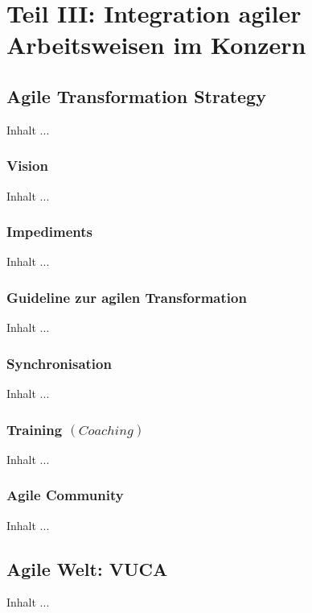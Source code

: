 
\chapter{Teil III: Integration agiler Arbeitsweisen im Konzern}
\minitoc 
\vspace{1 cm} 

\section{Agile Transformation Strategy}
Inhalt ...

\subsection{Vision}
Inhalt ...

\subsection{Impediments}
Inhalt ...

\subsection{Guideline zur agilen Transformation}
Inhalt ...

\subsection{Synchronisation}
Inhalt ...

\subsection{Training $(Coaching)$}
Inhalt ...

\subsection{Agile Community}
Inhalt ...


\section{Agile Welt: VUCA}
Inhalt ...

